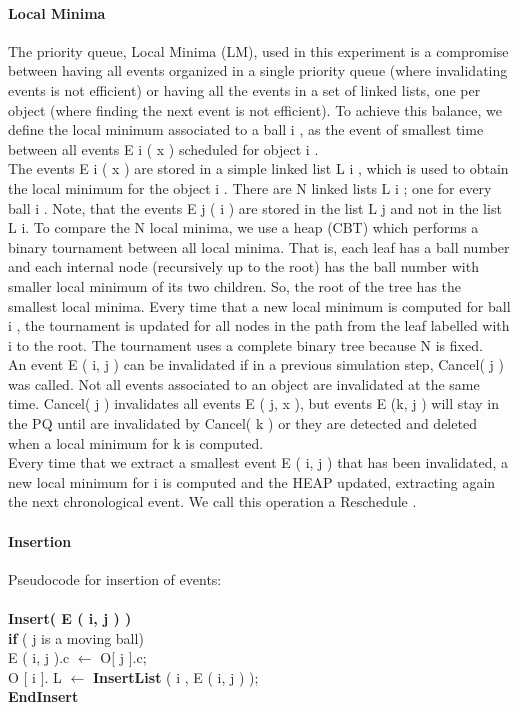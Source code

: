 \documentclass[12pt]{article}
\begin{document}
\paragraph{Local Minima}
The priority queue, Local Minima (LM), used in this experiment is a compromise between having all events organized in a single priority queue (where invalidating events is not efficient) or having all the events in a set of linked lists, one per object (where finding the next event is not efficient). To achieve this balance, we define the local minimum associated to a ball i , as the
event of smallest time between all events E i ( x ) scheduled for object i .\\
The events E i ( x ) are stored in a simple linked list L i , which is used to obtain the local minimum for the object i . There are N linked lists L i ; one for every ball i . Note, that the events E j ( i ) are stored in the list L j and not in the list L i. To compare the N local minima, we use a heap (CBT) which performs a binary tournament between all local minima. That is, each leaf has a ball number and each internal node (recursively up to the root) has the ball number with smaller local minimum of its two children. So, the root of the tree has the smallest local minima. Every time that a new local minimum is computed for ball i , the tournament
is updated for all nodes in the path from the leaf labelled with i to the root. The tournament uses a complete binary tree because N is fixed. \\
An event E ( i, j ) can be invalidated if in a previous simulation step, Cancel( j ) was called. Not all events associated to an object are invalidated at the same time. Cancel( j ) invalidates
all events E ( j, x ), but events E (k, j ) will stay in the PQ until are invalidated by Cancel( k ) or they are detected and deleted when a local minimum for k is computed. \\
Every time that we extract a smallest event E ( i, j ) that has been invalidated, a new local minimum for i is computed and the HEAP updated, extracting again the next chronological event. We call this operation a Reschedule .\\

\paragraph{Insertion}
Pseudocode for insertion of events: \\ \\
\indent \indent  \textbf{Insert( E ( i, j ) )}\\
\indent \indent \indent \textbf{if} ( j is a moving ball)\\
\indent \indent \indent \indent E ( i, j ).c $\leftarrow$ O[ j ].c;\\
\indent \indent \indent O [ i ]. L $\leftarrow$ \textbf{InsertList} ( i , E ( i, j ) );\\
\indent \indent  \textbf{EndInsert}\\
\\
\end{document}
